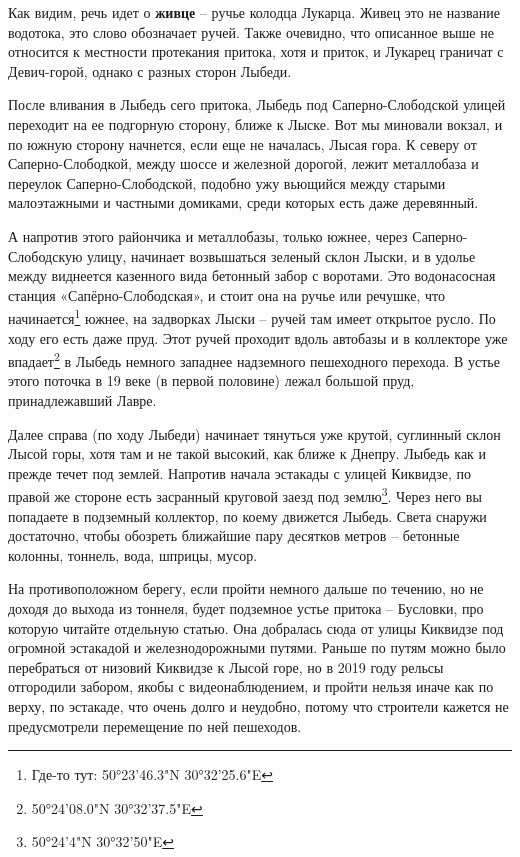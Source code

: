Как видим, речь идет о \textbf{живце} – ручье колодца Лукарца. Живец это не название водотока, это слово обозначает ручей. Также очевидно, что описанное выше не относится к местности протекания притока, хотя и приток, и Лукарец граничат с Девич-горой, однако с разных сторон Лыбеди.

После вливания в Лыбедь сего притока, Лыбедь под Саперно-Слободской улицей переходит на ее подгорную сторону, ближе к Лыске. Вот мы миновали вокзал, и по южную сторону начнется, если еще не началась, Лысая гора. К северу от Саперно-Слободкой, между шоссе и железной дорогой, лежит металлобаза и переулок Саперно-Слободской, подобно ужу вьющийся между старыми малоэтажными и частными домиками, среди которых есть даже деревянный.

А напротив этого райончика и металлобазы, только южнее, через Саперно-Слободскую улицу, начинает возвышаться зеленый склон Лыски, и в удолье между виднеется казенного вида бетонный забор с воротами. Это водонасосная станция «Сапёрно-Слободская», и стоит она на ручье или речушке, что начинается\footnote{Где-то тут: 50°23'46.3"N 30°32'25.6"E} южнее, на задворках Лыски – ручей там имеет открытое русло. По ходу его есть даже пруд. Этот ручей проходит вдоль автобазы и в коллекторе уже впадает\footnote{50°24'08.0"N 30°32'37.5"E} в Лыбедь немного западнее надземного пешеходного перехода. В устье этого поточка в 19 веке (в первой половине) лежал большой пруд, принадлежавший Лавре.

Далее справа (по ходу Лыбеди) начинает тянуться уже крутой, суглинный склон Лысой горы, хотя там и не такой высокий, как ближе к Днепру. Лыбедь как и прежде течет под землей. Напротив начала эстакады с улицей Киквидзе, по правой же стороне есть засранный круговой заезд под землю\footnote{50°24'4"N 30°32'50"E}. Через него вы попадаете в подземный коллектор, по коему движется Лыбедь. Света снаружи достаточно, чтобы обозреть ближайшие пару десятков метров – бетонные колонны, тоннель, вода, шприцы, мусор.

На противоположном берегу, если пройти немного дальше по течению, но не доходя до выхода из тоннеля, будет подземное устье притока – Бусловки, про которую читайте отдельную статью. Она добралась сюда от улицы Киквидзе под огромной эстакадой и железнодорожными путями. Раньше по путям можно было перебраться от низовий Киквидзе к Лысой горе, но в 2019 году рельсы отгородили забором, якобы с видеонаблюдением, и пройти нельзя иначе как по верху, по эстакаде, что очень долго и неудобно, потому что строители кажется не предусмотрели перемещение по ней пешеходов.

